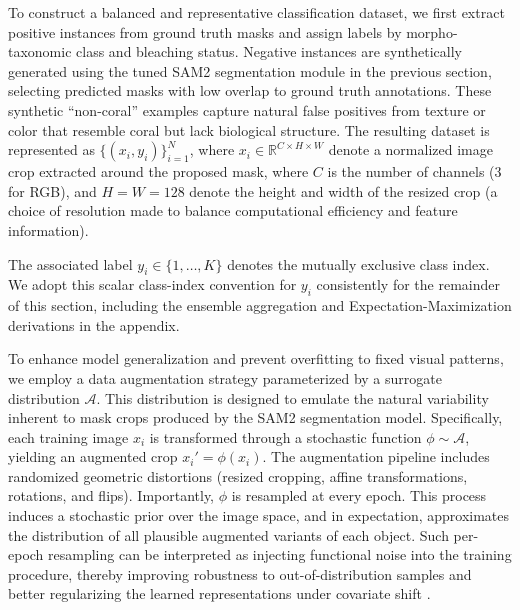 \documentclass[11pt]{elsarticle}
\begin{document}
To construct a balanced and representative classification dataset, we first extract positive instances from ground truth masks and assign labels by morpho-taxonomic class and bleaching status. Negative instances are synthetically generated using the tuned SAM2 segmentation module in the previous section, selecting predicted masks with low overlap to ground truth annotations. These synthetic ``non-coral'' examples capture natural false positives from texture or color that resemble coral but lack biological structure. The resulting dataset is represented as $\{(x_i, y_i)\}_{i=1}^N$, where $x_i \in \mathbb{R}^{C \times H \times W}$ denote a normalized image crop extracted around the proposed mask, where $C$ is the number of channels ($3$ for RGB), and $H = W = 128$ denote the height and width of the resized crop (a choice of resolution made to balance computational efficiency and feature information).

The associated label $y_i \in \{1, \ldots, K\}$ denotes the mutually exclusive class index. We adopt this scalar class-index convention for $y_i$ consistently for the remainder of this section, including the ensemble aggregation and Expectation-Maximization derivations in the appendix.

To enhance model generalization and prevent overfitting to fixed visual patterns, we employ a data augmentation strategy parameterized by a surrogate distribution $\mathcal{A}$. This distribution is designed to emulate the natural variability inherent to mask crops produced by the SAM2 segmentation model. Specifically, each training image $x_i$ is transformed through a stochastic function $\phi \sim \mathcal{A}$, yielding an augmented crop $x_i' = \phi(x_i)$. The augmentation pipeline includes randomized geometric distortions (resized cropping, affine transformations, rotations, and flips). Importantly, $\phi$ is resampled at every epoch. This process induces a stochastic prior over the image space, and in expectation, approximates the distribution of all plausible augmented variants of each object. Such per-epoch resampling can be interpreted as injecting functional noise into the training procedure, thereby improving robustness to out-of-distribution samples and better regularizing the learned representations under covariate shift \citep{chapelle2001vicinal, zhang2018mixup, cubuk2019autoaugment}.
\end{document}

